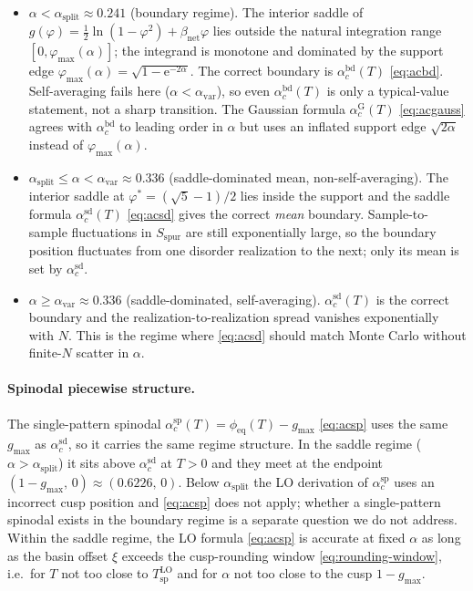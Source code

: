 \documentclass[11pt]{article}
\newcommand{\e}{{\mathrm{e}}}
\newcommand{\Bnet}{\beta_{\mathrm{net}}}
\newcommand{\phieq}{\phi_{\mathrm{eq}}}
\newcommand{\acGauss}{\alpha_c^{\mathrm{G}}}
\newcommand{\acBd}{\alpha_c^{\mathrm{bd}}}
\newcommand{\acSd}{\alpha_c^{\mathrm{sd}}}
\newcommand{\acSp}{\alpha_c^{\mathrm{sp}}}
\newcommand{\Tsp}{T_{\mathrm{sp}}}
\begin{document}
\begin{itemize}
\item \textbf{$\alpha < \alpha_{\mathrm{split}} \approx 0.241$}
(boundary regime).  The interior saddle of
$g(\varphi) = \tfrac12 \ln(1 - \varphi^2) + \Bnet\varphi$ lies
outside the natural integration range $[0, \varphi_{\max}(\alpha)]$;
the integrand is monotone and dominated by the support edge
$\varphi_{\max}(\alpha) = \sqrt{1 - \e^{-2\alpha}}$.  The correct
boundary is $\acBd(T)$ \eqref{eq:acbd}.  Self-averaging fails
here ($\alpha < \alpha_{\mathrm{var}}$), so even $\acBd(T)$ is only
a typical-value statement, not a sharp transition.  The Gaussian
formula $\acGauss(T)$ \eqref{eq:acgauss} agrees with $\acBd$ to
leading order in $\alpha$ but uses an inflated support edge
$\sqrt{2\alpha}$ instead of $\varphi_{\max}(\alpha)$.

\item \textbf{$\alpha_{\mathrm{split}} \leq \alpha < \alpha_{\mathrm{var}}
\approx 0.336$} (saddle-dominated mean, non-self-averaging).  The
interior saddle at $\varphi^{*} = (\sqrt 5 - 1)/2$ lies inside the
support and the saddle formula $\acSd(T)$ \eqref{eq:acsd} gives the
correct \emph{mean} boundary.  Sample-to-sample fluctuations in
$S_{\mathrm{spur}}$ are still exponentially large, so the boundary
position fluctuates from one disorder realization to the next; only
its mean is set by $\acSd$.

\item \textbf{$\alpha \geq \alpha_{\mathrm{var}} \approx 0.336$}
(saddle-dominated, self-averaging).  $\acSd(T)$ is the correct
boundary and the realization-to-realization spread vanishes
exponentially with $N$.  This is the regime where
\eqref{eq:acsd} should match Monte Carlo without finite-$N$ scatter
in $\alpha$.
\end{itemize}

\paragraph{Spinodal piecewise structure.}
The single-pattern spinodal $\acSp(T) = \phieq(T) - g_{\max}$
\eqref{eq:acsp} uses the same $g_{\max}$ as $\acSd$, so it carries
the same regime structure.  In the saddle regime
($\alpha > \alpha_{\mathrm{split}}$) it sits above $\acSd$ at
$T > 0$ and they meet at the endpoint
$(1 - g_{\max},\,0) \approx (0.6226,\,0)$.  Below
$\alpha_{\mathrm{split}}$ the LO derivation of $\acSp$ uses an
incorrect cusp position and \eqref{eq:acsp} does not apply; whether
a single-pattern spinodal exists in the boundary regime is a
separate question we do not address.  Within the saddle regime, the
LO formula \eqref{eq:acsp} is accurate at fixed $\alpha$ as long
as the basin offset $\xi$ exceeds the cusp-rounding window
\eqref{eq:rounding-window}, i.e.\ for $T$ not too close to
$\Tsp^{\mathrm{LO}}$ and for $\alpha$ not too close to the cusp
$1 - g_{\max}$.
\end{document}
